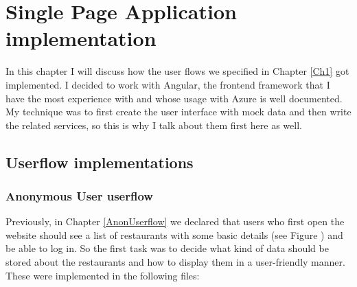 \chapter{Single Page Application implementation}\label{Ch3}
 
 In this chapter I will discuss how the user flows we specified in Chapter \ref{Ch1} got implemented. I decided to work with Angular, the frontend framework that I have the most experience with and whose usage with Azure is well documented. My technique was to first create the user interface with mock data and then write the related services, so this is why I talk about them first here as well. 
 
\section{Userflow implementations}
 
\subsection{Anonymous User userflow}

Previously, in Chapter \ref{AnonUserflow} we declared that users who first open the website should see a list of restaurants with some basic details (see Figure ) and be able to log in. So the first task was to decide what kind of data should be stored about the restaurants and how to display them in a user-friendly manner. These were implemented in the following files:

